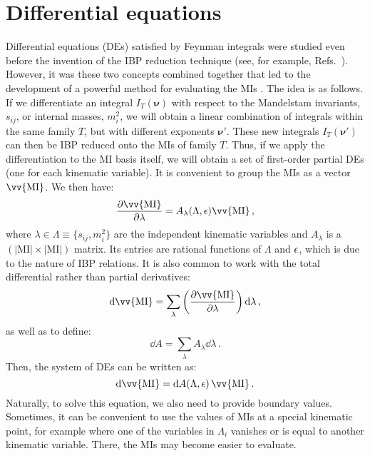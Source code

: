 \documentclass[main.tex]{subfiles}
\begin{document}
\section{Differential equations} \label{sec:DEs}
Differential equations (DEs) satisfied by Feynman integrals were studied even before the invention of the IBP reduction technique (see, for example, Refs.~\cite{Barucchi:1973zm, Golubeva:1976}). However, it was these two concepts combined together that led to the development of a powerful method for evaluating the MIs \cite{Kotikov:1990kg, Kotikov:1991314, Bern:1993kr, Remiddi:1997ny, Gehrmann:1999as}. The idea is as follows. If we differentiate an integral $I_T(\bm{\nu})$ with respect to the Mandelstam invariants, $s_{ij}$, or internal masses, $m_i^2$, we will obtain a linear combination of integrals within the same family $T$, but with different exponents $\bm{\nu}'$. These new integrals $I_T(\bm{\nu}')$ can then be IBP reduced onto the MIs of family $T$. Thus, if we apply the differentiation to the MI basis itself, we will obtain a set of first-order partial DEs (one for each kinematic variable). It is convenient to group the MIs as a vector $\vv{\text{MI}}$. We then have:
\begin{equation} \label{eq:DEspartial}
    \frac{\partial \vv{\text{MI}}}{\partial \lambda} = A_{\lambda}(\Lambda, \eps) \vv{\text{MI}}\,,
\end{equation}
where $\lambda \in \Lambda \equiv \{s_{ij}, m_i^2\}$ are the independent kinematic variables and $A_\lambda$ is a $\left(|\text{MI}| \times |\text{MI}|\right)$ matrix. Its entries are rational functions of $\Lambda$ and $\epsilon$, which is due to the nature of IBP relations. It is also common to work with the total differential rather than partial derivatives:
\begin{equation}
    \dd \vv{\text{MI}} = \sum_{\lambda} \left(\frac{\partial \vv{\text{MI}}}{\partial \lambda} \right) \dd \lambda\,,
\end{equation}
as well as to define:
\begin{equation}
    \dd A = \sum_\lambda A_\lambda \dd\lambda\,.
\end{equation}
Then, the system of DEs can be written as:
\begin{equation} \label{eq:DEsoneform}
    \dd \vv{\text{MI}} = \dd A(\Lambda, \eps) \,\vv{\text{MI}}\,.
\end{equation}
Naturally, to solve this equation, we also need to provide boundary values. Sometimes, it can be convenient to use the values of MIs at a special kinematic point, for example where one of the variables in $\Lambda_i$ vanishes or is equal to another kinematic variable. There, the MIs may become easier to evaluate. 
\end{document}
